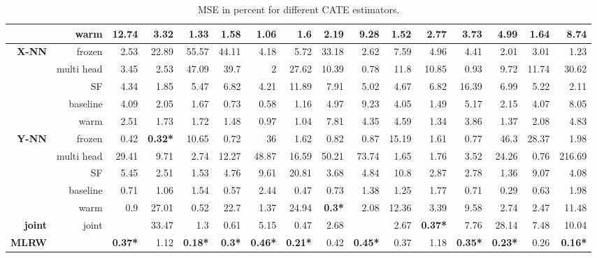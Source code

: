 \begin{table}
\begin{flushleft}
\begin{tabular}{rrrrrrrrrrrrrrrr}
   & warm & 12.74 & 3.32 & 1.33 & 1.58 & 1.06 & 1.6 & 2.19 & 9.28 & 1.52 & 2.77 & 3.73 & 4.99 & 1.64 & 8.74 \\ 
   \hline
{\textbf{X-NN}} & frozen & 2.53 & 22.89 & 55.57 & 44.11 & 4.18 & 5.72 & 33.18 & 2.62 & 7.59 & 4.96 & 4.41 & 2.01 & 3.01 & 1.23 \\ 
   & multi head & 3.45 & 2.53 & 47.09 & 39.7 & 2 & 27.62 & 10.39 & 0.78 & 11.8 & 10.85 & 0.93 & 9.72 & 11.74 & 30.62 \\ 
   & SF & 4.34 & 1.85 & 5.47 & 6.82 & 4.21 & 11.89 & 7.91 & 5.02 & 4.67 & 6.82 & 16.39 & 6.99 & 5.22 & 2.11 \\ 
   & baseline & 4.09 & 2.05 & 1.67 & 0.73 & 0.58 & 1.16 & 4.97 & 9.23 & 4.05 & 1.49 & 5.17 & 2.15 & 4.07 & 8.05 \\ 
   & warm & 2.51 & 1.73 & 1.72 & 1.48 & 0.97 & 1.04 & 7.81 & 4.35 & 4.59 & 1.34 & 3.86 & 1.37 & 2.08 & 4.83 \\ 
   \hline
{\textbf{Y-NN}} & frozen & 0.42 & {\textbf{0.32*}} & 10.65 & 0.72 & 36 & 1.62 & 0.82 & 0.87 & 15.19 & 1.61 & 0.77 & 46.3 & 28.37 & 1.98 \\ 
   & multi head & 29.41 & 9.71 & 2.74 & 12.27 & 48.87 & 16.59 & 50.21 & 73.74 & 1.65 & 1.76 & 3.52 & 24.26 & 0.76 & 216.69 \\ 
   & SF & 5.45 & 2.51 & 1.53 & 4.76 & 9.61 & 20.81 & 3.68 & 4.84 & 10.8 & 2.87 & 2.78 & 1.36 & 9.07 & 4.08 \\ 
   & baseline & 0.71 & 1.06 & 1.54 & 0.57 & 2.44 & 0.47 & 0.73 & 1.38 & 1.25 & 1.77 & 0.71 & 0.29 & 0.63 & 1.98 \\ 
   & warm & 0.9 & 27.01 & 0.52 & 22.7 & 1.37 & 24.94 & {\textbf{0.3*}} & 2.08 & 12.36 & 3.39 & 9.58 & 2.74 & 2.47 & 11.48 \\ 
   \hline
{\textbf{joint}} & joint &  & 33.47 & 1.3 & 0.61 & 5.15 & 0.47 & 2.68 &  & 2.67 & {\textbf{0.37*}} & 7.76 & 28.14 & 7.48 & 10.04 \\ 
   \hline
{\textbf{MLRW}} &  & {\textbf{0.37*}} & 1.12 & {\textbf{0.18*}} & {\textbf{0.3*}} & {\textbf{0.46*}} & {\textbf{0.21*}} & 0.42 & {\textbf{0.45*}} & 0.37 & 1.18 & {\textbf{0.35*}} & {\textbf{0.23*}} & 0.26 & {\textbf{0.16*}} \\ 
  \end{tabular}
\caption{MSE in percent for different CATE estimators.} 
\label{table:RF}
\end{flushleft}
\end{table}
